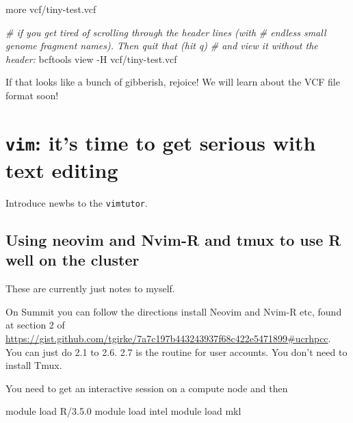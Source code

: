 \documentclass[]{krantz}
\makeatletter
\newenvironment{Shaded}{\begin{snugshade}}{\end{snugshade}}
\newcommand{\CommentTok}[1]{\textcolor[rgb]{0.37,0.37,0.37}{\textit{#1}}}
\newcommand{\ExtensionTok}[1]{#1}
\newcommand{\FunctionTok}[1]{\textcolor[rgb]{0,0,0}{#1}}
\newcommand{\NormalTok}[1]{#1}
\newenvironment{kframe}{%
\medskip{}
\setlength{\fboxsep}{.8em}
 \def\at@end@of@kframe{}%
 \ifinner\ifhmode%
  \def\at@end@of@kframe{\end{minipage}}%
  \begin{minipage}{\columnwidth}%
 \fi\fi%
 \def\FrameCommand##1{\hskip\@totalleftmargin \hskip-\fboxsep
 \colorbox{shadecolor}{##1}\hskip-\fboxsep
     \hskip-\linewidth \hskip-\@totalleftmargin \hskip\columnwidth}%
 \MakeFramed {\advance\hsize-\width
   \@totalleftmargin\z@ \linewidth\hsize
   \@setminipage}}%
 {\par\unskip\endMakeFramed%
 \at@end@of@kframe}
\renewenvironment{Shaded}{\begin{kframe}}{\end{kframe}}
\makeatother
\begin{document}
\begin{Shaded}
\begin{Highlighting}[]
\FunctionTok{more}\NormalTok{ vcf/tiny-test.vcf}

\CommentTok{# if you get tired of scrolling through the header lines (with}
\CommentTok{# endless small genome fragment names). Then quit that (hit q)}
\CommentTok{# and view it without the header:}
\ExtensionTok{bcftools}\NormalTok{ view -H vcf/tiny-test.vcf}
\end{Highlighting}
\end{Shaded}

If that looks like a bunch of gibberish, rejoice! We will learn about the VCF file
format soon!

\hypertarget{vim-its-time-to-get-serious-with-text-editing}{%
\section{\texorpdfstring{\texttt{vim}: it's time to get serious with text editing}{vim: it's time to get serious with text editing}}\label{vim-its-time-to-get-serious-with-text-editing}}

Introduce newbs to the \texttt{vimtutor}.

\hypertarget{using-neovim-and-nvim-r-and-tmux-to-use-r-well-on-the-cluster}{%
\subsection{Using neovim and Nvim-R and tmux to use R well on the cluster}\label{using-neovim-and-nvim-r-and-tmux-to-use-r-well-on-the-cluster}}

These are currently just notes to myself.

On Summit you can follow the directions install Neovim and Nvim-R etc, found
at section 2 of \url{https://gist.github.com/tgirke/7a7c197b443243937f68c422e5471899\#ucrhpcc}.
You can just do 2.1 to 2.6. 2.7 is the routine for user accounts. You don't need to install Tmux.

You need to get an interactive session on a compute node and then

\begin{Shaded}
\begin{Highlighting}[]
\ExtensionTok{module}\NormalTok{ load R/3.5.0}
\ExtensionTok{module}\NormalTok{ load intel}
\ExtensionTok{module}\NormalTok{ load mkl  }
\end{Highlighting}
\end{Shaded}
\end{document}

